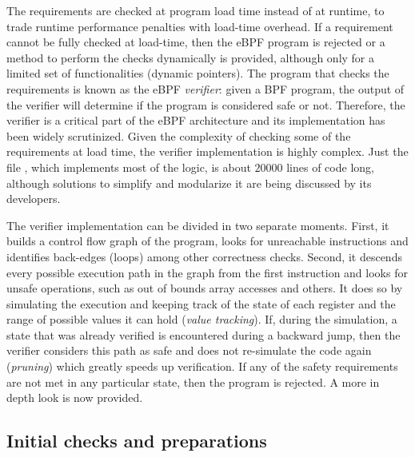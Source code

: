 
The requirements are checked at program load time instead of at runtime, to
trade runtime performance penalties with load-time overhead. If a requirement
cannot be fully checked at load-time, then the eBPF program is rejected or a
method to perform the checks dynamically is provided, although only for a
limited set of functionalities (dynamic pointers). The program that checks the
requirements is known as the eBPF \textit{verifier}: given a BPF program, the
output of the verifier will determine if the program is considered safe or not.
Therefore, the verifier is a critical part of the eBPF architecture and its
implementation has been widely scrutinized. Given the complexity of checking
some of the requirements at load time, the verifier implementation is highly
complex. Just the file , which implements
most of the logic, is about $20000$ lines of code long, although solutions to
simplify and modularize it are being discussed by its developers.

The verifier implementation can be divided in two separate moments. First, it
builds a control flow graph of the program, looks for unreachable instructions
and identifies back-edges (loops) among other correctness checks. Second, it
descends every possible execution path in the graph from the first instruction
and looks for unsafe operations, such as out of bounds array accesses and
others. It does so by simulating the execution and keeping track of the state of
each register and the range of possible values it can hold (\textit{value
tracking}). If, during the simulation, a state that was already verified is
encountered during a backward jump, then the verifier considers this path as
safe and does not re-simulate the code again (\textit{pruning}) which greatly
speeds up verification. If any of the safety requirements are not met in any
particular state, then the program is rejected. A more in depth look is now
provided.

\subsection{Initial checks and preparations}

